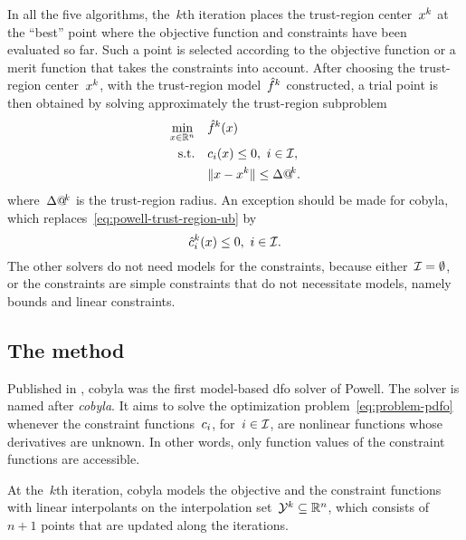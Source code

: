 In all the five algorithms, the~$k$th iteration places the trust-region center~$\iter[k]$ at the \enquote{best} point where the objective function and constraints have been evaluated so far.
Such a point is selected according to the objective function or a merit function that takes the constraints into account.
After choosing the trust-region center~$\iter[k]$, with the trust-region model~$\objm[k]$ constructed, a trial point is then obtained by solving approximately the trust-region subproblem
\begin{subequations}
    \label{eq:powell-trust-region}
    \begin{align}
        \min_{\iter \in \R^n}   & \quad \objm[k](\iter)\\
        \text{s.t.}             & \quad \con{i}(\iter) \le 0, ~ i \in \iub, \label{eq:powell-trust-region-ub}\\
                                & \quad \norm{\iter - \iter[k]} \le \rad[k].
    \end{align}
\end{subequations}
where~$\rad[k]$ is the trust-region radius.
An exception should be made for \gls{cobyla}, which replaces~\cref{eq:powell-trust-region-ub} by
\begin{equation*}
    \conm[k]{i}(\iter) \le 0, ~ i \in \iub.
\end{equation*}
The other solvers do not need models for the constraints, because either~$\mathcal{I} = \emptyset$, or the constraints are simple constraints that do not necessitate models, namely bounds and linear constraints.

\subsection{The  method}
\label{subsec:cobyla}

Published in , \gls{cobyla} was the first model-based \gls{dfo} solver of Powell.
The solver is named after \emph{\glsdesc{cobyla}}.
It aims to solve the optimization problem~\cref{eq:problem-pdfo} whenever the constraint functions~$c_{i}$, for~$i \in \mathcal{I}$, are nonlinear functions whose derivatives are unknown.
In other words, only function values of the constraint functions are accessible.

At the~$k$th iteration, \gls{cobyla} models the objective and the constraint functions with linear interpolants on the interpolation set~$\xpt[k] \subseteq \R^n$, which consists of~$n + 1$ points that are updated along the iterations.

